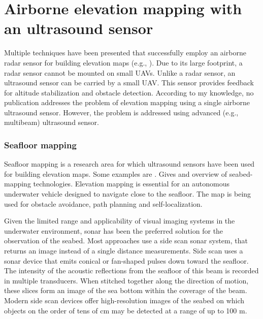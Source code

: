 \section{Airborne elevation mapping with an ultrasound sensor}
\label{sec:related-research-elevation-mapping}
Multiple techniques have been presented that successfully employ an airborne radar sensor for building elevation maps (e.g., \cite{foessel2000radar, weiß2006airborne}).
Due to its large footprint, a radar sensor cannot be mounted on small UAVs.
Unlike a radar sensor, an ultrasound sensor can be carried by a small UAV.
This sensor provides feedback for altitude stabilization and obstacle detection.
According to my knowledge, no publication addresses the problem of elevation mapping using a single airborne ultrasound sensor.
However, the problem is addressed using advanced (e.g., multibeam) ultrasound sensor.

\subsubsection{Seafloor mapping}
Seafloor mapping is a research area for which ultrasound sensors have been used for building elevation maps. Some examples are \cite{johnson1996seafloor,strauss1999multibeam,zerr1996three,evans2002three}.
\cite{kenny2003overview} Gives and overview of seabed-mapping technologies.
Elevation mapping is essential for an autonomous underwater vehicle designed to navigate close to the seafloor.
The map is being used for obstacle avoidance, path planning and self-localization.

Given the limited range and applicability of visual imaging systems in the underwater environment,
sonar has been the preferred solution \cite{blondel1997handbook} for the observation of the seabed.
Most approaches use a side scan sonar system, that returns an image instead of a single distance measurements.
Side scan uses a sonar device that emits conical or fan-shaped pulses down toward the seafloor.
The intensity of the acoustic reflections from the seafloor of this beam is recorded in multiple transducers.
When stitched together along the direction of motion, these slices form an image of the sea bottom within the coverage of the beam.
Modern side scan devices offer high-resolution images of the seabed on which objects on the order of tens of cm may be detected at a range of up to 100 m.


